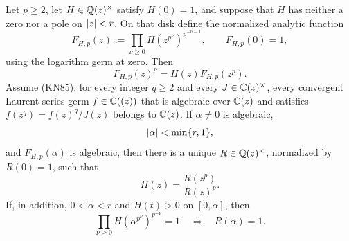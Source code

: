 \begin{theorem}
\label{thm:general-rational-p-mahler-lifting}
Let \(p\ge2\), let \(H\in\mathbb{Q}(z)^\times\) satisfy \(H(0)=1\), and suppose
that \(H\) has neither a zero nor a pole on \(\lvert z \rvert<r\).  On that disk define
the normalized analytic function
\begin{equation}\label{eq:general-critical-p-mahler-product}
 F_{H,p}(z):=\prod_{\nu\ge0}
 H(z^{p^\nu})^{p^{-\nu-1}},
 \qquad F_{H,p}(0)=1,
\end{equation}
using the logarithm germ at zero.  Then
\begin{equation}\label{eq:general-critical-p-mahler-equation}
 F_{H,p}(z)^p=H(z)F_{H,p}(z^p).
\end{equation}
Assume \textup{(KN85)}: for every integer \(q\ge2\) and every
\(J\in\mathbb{C}(z)^\times\), every convergent Laurent-series germ
\(f\in\mathbb{C}((z))\) that is algebraic over \(\mathbb{C}(z)\) and satisfies
\(f(z^q)=f(z)^q/J(z)\) belongs to \(\mathbb{C}(z)\).
If \(\alpha\ne0\) is algebraic,
\[
 \lvert \alpha \rvert<\min\{r,1\},
\]
and \(F_{H,p}(\alpha)\) is algebraic, then there is a unique
\(R\in\mathbb{Q}(z)^\times\), normalized by \(R(0)=1\), such that
\begin{equation}\label{eq:general-critical-p-mahler-lifted-certificate}
 H(z)=\frac{R(z^p)}{R(z)^p}.
\end{equation}
If, in addition, \(0<\alpha<r\) and \(H(t)>0\) on \([0,\alpha]\), then
\begin{equation}\label{eq:general-critical-p-mahler-positive-equivalence}
 \prod_{\nu\ge0}H(\alpha^{p^\nu})^{p^{-\nu}}=1
 \quad\Longleftrightarrow\quad R(\alpha)=1.
\end{equation}
\end{theorem}

